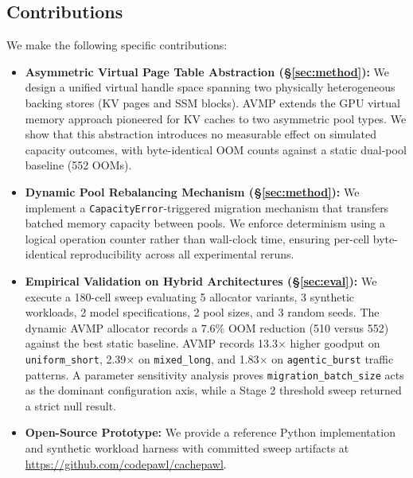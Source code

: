 \subsection{Contributions}
\label{sec:intro:contributions}

We make the following specific contributions:

\begin{itemize}[leftmargin=1.4em, itemsep=2pt, topsep=4pt]
\item \textbf{Asymmetric Virtual Page Table Abstraction (\S\ref{sec:method}):} We design a unified virtual handle space spanning two physically heterogeneous backing stores (KV pages and SSM blocks). AVMP extends the GPU virtual memory approach pioneered for KV caches \cite{xu2024vtensor} to two asymmetric pool types. We show that this abstraction introduces no measurable effect on simulated capacity outcomes, with byte-identical OOM counts against a static dual-pool baseline (552 OOMs).

\item \textbf{Dynamic Pool Rebalancing Mechanism (\S\ref{sec:method}):} We implement a \texttt{CapacityError}-triggered migration mechanism that transfers batched memory capacity between pools. We enforce determinism using a logical operation counter rather than wall-clock time, ensuring per-cell byte-identical reproducibility across all experimental reruns.

\item \textbf{Empirical Validation on Hybrid Architectures (\S\ref{sec:eval}):} We execute a 180-cell sweep evaluating 5 allocator variants, 3 synthetic workloads, 2 model specifications, 2 pool sizes, and 3 random seeds. The dynamic AVMP allocator records a 7.6\% OOM reduction (510 versus 552) against the best static baseline. AVMP records 13.3$\times$ higher goodput on \texttt{uniform\_short}, 2.39$\times$ on \texttt{mixed\_long}, and 1.83$\times$ on \texttt{agentic\_burst} traffic patterns. A parameter sensitivity analysis proves \texttt{migration\_batch\_size} acts as the dominant configuration axis, while a Stage 2 threshold sweep returned a strict null result.

\item \textbf{Open-Source Prototype:} We provide a reference Python implementation and synthetic workload harness with committed sweep artifacts at \url{https://github.com/codepawl/cachepawl}.
\end{itemize}
